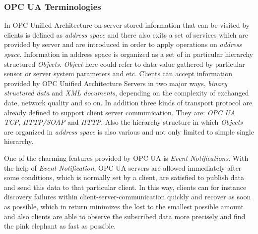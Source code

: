 \documentclass[]{llncs}
\begin{document}
\subsubsection{OPC UA Terminologies}
In OPC Unified Architecture on server stored information that can be visited by clients is defined as \emph{address space}\cite{O3} and there also exits a set of services\cite{O4} which are provided by server and are introduced in order to apply operations on \emph{address space}. Information in address space is organized as a set of in particular hierarchy structured \emph{Objects}. \emph{Object} here could refer to data value gathered by particular sensor or server system parameters  and etc. Clients can accept information provided by OPC Unified Architecture Servers in two major ways, \emph{binary structured data} and \emph{XML documents}, depending on the complexity of exchanged date, network quality and so on. In addition three kinds of transport protocol are already defined to support client server communication. They are: \emph{OPC UA TCP}, \emph{HTTP/SOAP} and \emph{HTTP}. Also the hierarchy structure in which \emph{Objects} are organized in \emph{address space} is also various and not only limited to simple single hierarchy.   

One of the charming features provided by OPC UA is \emph{Event Notifications}. With the help of \emph{Event Notification}, OPC UA servers are allowed immediately after some conditions, which is normally set  by a client, are satisfied to publish data and   send this data  to that  particular  client. In this way, clients can for instance discovery failures within client-server-communication quickly and recover as soon as possible, which in return minimizes the lost to the smallest possible amount and also clients are able to observe the subscribed data more precisely and find the pink elephant as fast as possible.
\end{document}
